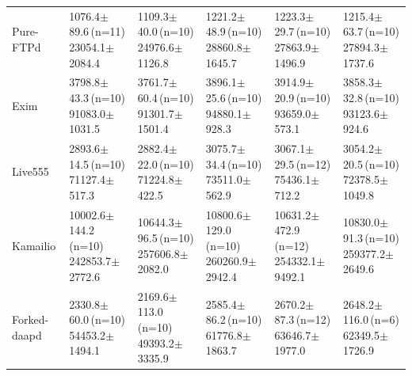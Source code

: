 \documentclass[final,5p,times,number]{elsarticle}
\begin{document}
\begin{table}[!tbp]
\begin{tabularx}{\textwidth}{l *{5}{>{\centering\arraybackslash}X}}
\addlinespace[3pt]
Pure-FTPd & \shortstack{1076.4$\pm$89.6\,(n=11)\\23054.1$\pm$2084.4} & \shortstack{1109.3$\pm$40.0\,(n=10)\\24976.6$\pm$1126.8} & \shortstack{1221.2$\pm$48.9\,(n=10)\\28860.8$\pm$1645.7} & \shortstack{1223.3$\pm$29.7\,(n=10)\\27863.9$\pm$1496.9} & \shortstack{1215.4$\pm$63.7\,(n=10)\\27894.3$\pm$1737.6} \\
\addlinespace[3pt]
Exim & \shortstack{3798.8$\pm$43.3\,(n=10)\\91083.0$\pm$1031.5} & \shortstack{3761.7$\pm$60.4\,(n=10)\\91301.7$\pm$1501.4} & \shortstack{3896.1$\pm$25.6\,(n=10)\\94880.1$\pm$928.3} & \shortstack{3914.9$\pm$20.9\,(n=10)\\93659.0$\pm$573.1} & \shortstack{3858.3$\pm$32.8\,(n=10)\\93123.6$\pm$924.6} \\
\addlinespace[3pt]
Live555 & \shortstack{2893.6$\pm$14.5\,(n=10)\\71127.4$\pm$517.3} & \shortstack{2882.4$\pm$22.0\,(n=10)\\71224.8$\pm$422.5} & \shortstack{3075.7$\pm$34.4\,(n=10)\\73511.0$\pm$562.9} & \shortstack{3067.1$\pm$29.5\,(n=12)\\75436.1$\pm$712.2} & \shortstack{3054.2$\pm$20.5\,(n=10)\\72378.5$\pm$1049.8} \\
\addlinespace[3pt]
Kamailio & \shortstack{10002.6$\pm$144.2\,(n=10)\\242853.7$\pm$2772.6} & \shortstack{10644.3$\pm$96.5\,(n=10)\\257606.8$\pm$2082.0} & \shortstack{10800.6$\pm$129.0\,(n=10)\\260260.9$\pm$2942.4} & \shortstack{10631.2$\pm$472.9\,(n=12)\\254332.1$\pm$9492.1} & \shortstack{10830.0$\pm$91.3\,(n=10)\\259377.2$\pm$2649.6} \\
\addlinespace[3pt]
Forked-daapd & \shortstack{2330.8$\pm$60.0\,(n=10)\\54453.2$\pm$1494.1} & \shortstack{2169.6$\pm$113.0\,(n=10)\\49393.2$\pm$3335.9} & \shortstack{2585.4$\pm$86.2\,(n=10)\\61776.8$\pm$1863.7} & \shortstack{2670.2$\pm$87.3\,(n=12)\\63646.7$\pm$1977.0} & \shortstack{2648.2$\pm$116.0\,(n=6)\\62349.5$\pm$1726.9} \\

\end{tabularx}
\end{table}
\end{document}
